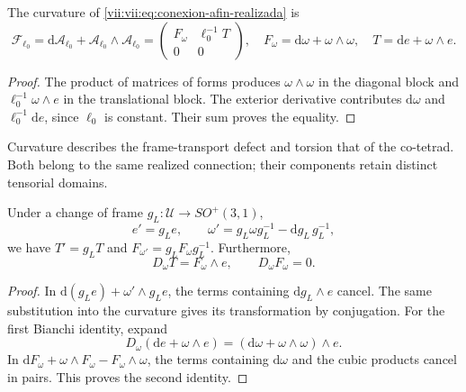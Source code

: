 \begin{proposition}
\label{vii:vii:prop:curvatura-afin}
The curvature of \eqref{vii:vii:eq:conexion-afin-realizada} is
\begin{equation}
 \mathcal F_{\ell_0}
 =\mathrm d\mathcal A_{\ell_0}
   +\mathcal A_{\ell_0}\wedge\mathcal A_{\ell_0}
 =\begin{pmatrix}F_\omega&\ell_0^{-1}T\\0&0\end{pmatrix},
 \quad F_\omega=\mathrm d\omega+\omega\wedge\omega,
 \quad T=\mathrm de+\omega\wedge e.
 \label{vii:vii:eq:curvatura-afin-realizada}
\end{equation}
\end{proposition}
\begin{proof}
The product of matrices of forms produces
\(\omega\wedge\omega\) in the diagonal block and
\(\ell_0^{-1}\omega\wedge e\) in the translational block.
The exterior derivative contributes
\(\mathrm d\omega\) and \(\ell_0^{-1}\mathrm de\), since
\(\ell_0\) is constant. Their sum proves the equality.
\end{proof}

Curvature describes the frame-transport defect and torsion
that of the co-tetrad. Both belong to the same realized connection;
their components retain distinct tensorial domains.

\begin{proposition}
\label{vii:vii:prop:bianchi-cartan}
Under a change of frame \(g_L:\mathcal U\to SO^+(3,1)\),
\[
 e'=g_Le,\qquad
 \omega'=g_L\omega g_L^{-1}-\mathrm dg_L\,g_L^{-1},
\]
we have \(T'=g_LT\) and \(F_{\omega'}=g_LF_\omega g_L^{-1}\).
Furthermore,
\begin{equation}
 D_\omega T=F_\omega\wedge e,\qquad D_\omega F_\omega=0.
 \label{vii:vii:eq:bianchi-realizacion}
\end{equation}
\end{proposition}
\begin{proof}
In \(\mathrm d(g_Le)+\omega'\wedge g_Le\), the terms
containing \(\mathrm dg_L\wedge e\) cancel.
The same substitution into the curvature gives its transformation by
conjugation. For the first Bianchi identity, expand
\[
 D_\omega(\mathrm de+\omega\wedge e)
 =(\mathrm d\omega+\omega\wedge\omega)\wedge e.
\]
In \(\mathrm dF_\omega+\omega\wedge F_\omega-F_\omega\wedge\omega\),
the terms containing \(\mathrm d\omega\) and the cubic
products cancel in pairs. This proves the second identity.
\end{proof}

